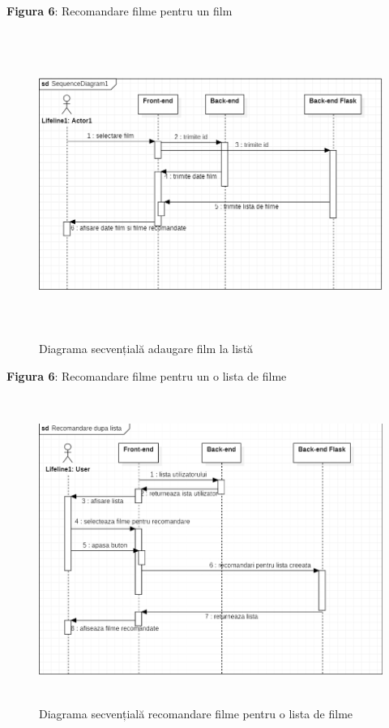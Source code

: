 \par \textbf{Figura 6}: Recomandare filme pentru un film
		\begin{figure}[!h]
			\centerline{\includegraphics[width=14cm, height=10cm]{figures/recomandarea de filme.png}}
			\caption{Diagrama secvențială adaugare film la listă}
			\label{fig}
		\end{figure}

\par \textbf{Figura 6}: Recomandare filme pentru un o lista de filme
		\begin{figure}[!h]
			\centerline{\includegraphics[width=14cm, height=10cm]{figures/rec.png}}
			\caption{Diagrama secvențială recomandare filme pentru o lista de filme}
			\label{fig}
		\end{figure}

